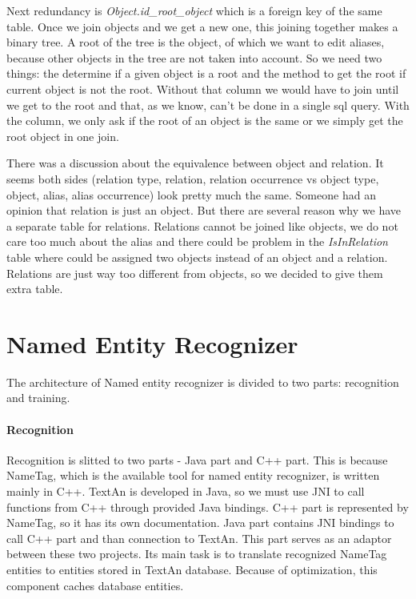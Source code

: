 Next redundancy is \emph{Object.id\_{}root\_{}object} which is a foreign key of the same table. Once we join objects and we get a new one, this joining together makes a binary tree. A root of the tree is the object, of which we want to edit aliases, because other objects in the tree are not taken into account. So we need two things: the determine if a given object is a root and the method to get the root if current object is not the root. Without that column we would have to join until we get to the root and that, as we know, can't be done in a single sql query. With the column, we only ask if the root of an object is the same or we simply get the root object in one join.

There was a discussion about the equivalence between object and relation. It seems both sides (relation type, relation, relation occurrence vs object type, object, alias, alias occurrence) look pretty much the same. Someone had an opinion that relation is just an object. But there are several reason why we have a separate table for relations.
Relations cannot be joined like objects, we do not care too much about the alias and there could be problem in the \emph{IsInRelation} table where could be assigned two objects instead of an object and a relation.
Relations are just way too different from objects, so we decided to give them extra table.



\section{Named Entity Recognizer}
\label{sec:NamedEntityRecognizer}

The architecture of Named entity recognizer is divided to two parts: recognition and training.

\paragraph{Recognition} 
Recognition is slitted to two parts - Java part and C++ part. This is because
NameTag, which is the available tool for named entity recognizer, is written mainly in C++. 
TextAn is developed in Java, so we must use JNI to call functions from C++ through provided
Java bindings. C++ part is represented by NameTag, so it has its own documentation.
Java part contains JNI bindings to call C++ part and than connection to TextAn.
This part serves as an adaptor between these two projects. Its main task is
to translate recognized NameTag entities to entities stored in TextAn database.
Because of optimization, this component caches database entities.


